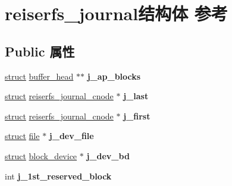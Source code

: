 \hypertarget{structreiserfs__journal}{}\section{reiserfs\+\_\+journal结构体 参考}
\label{structreiserfs__journal}
\subsection*{Public 属性}
\begin{DoxyCompactItemize}
\item 
\mbox{\label{structreiserfs__journal_a9f087ce1da2cf35db2c13bbc217bff62}} 
\hyperlink{interfacestruct}{struct} \hyperlink{structbuffer__head}{buffer\+\_\+head} $\ast$$\ast$ {\bfseries j\+\_\+ap\+\_\+blocks}
\item 
\mbox{\label{structreiserfs__journal_a4a960beb6cfd213bd7dc290c8298be38}} 
\hyperlink{interfacestruct}{struct} \hyperlink{structreiserfs__journal__cnode}{reiserfs\+\_\+journal\+\_\+cnode} $\ast$ {\bfseries j\+\_\+last}
\item 
\mbox{\label{structreiserfs__journal_a1e9c578314b0327a28d771f861c09fd3}} 
\hyperlink{interfacestruct}{struct} \hyperlink{structreiserfs__journal__cnode}{reiserfs\+\_\+journal\+\_\+cnode} $\ast$ {\bfseries j\+\_\+first}
\item 
\mbox{\label{structreiserfs__journal_afde3e6ac99ce39545478c8c46757a09b}} 
\hyperlink{interfacestruct}{struct} \hyperlink{structfile}{file} $\ast$ {\bfseries j\+\_\+dev\+\_\+file}
\item 
\mbox{\label{structreiserfs__journal_a773f1d1d523dcd4095cd55a50e13b0e1}} 
\hyperlink{interfacestruct}{struct} \hyperlink{structblock__device}{block\+\_\+device} $\ast$ {\bfseries j\+\_\+dev\+\_\+bd}
\item 
\mbox{\label{structreiserfs__journal_a13acb2e1c53044eb1886c761fd8c617c}} 
int {\bfseries j\+\_\+1st\+\_\+reserved\+\_\+block}
\item 
\mbox{\label{structreiserfs__journal_a5cd88b2648fef356766576df27ddc888}} 
$$
\end{DoxyCompactItemize}
